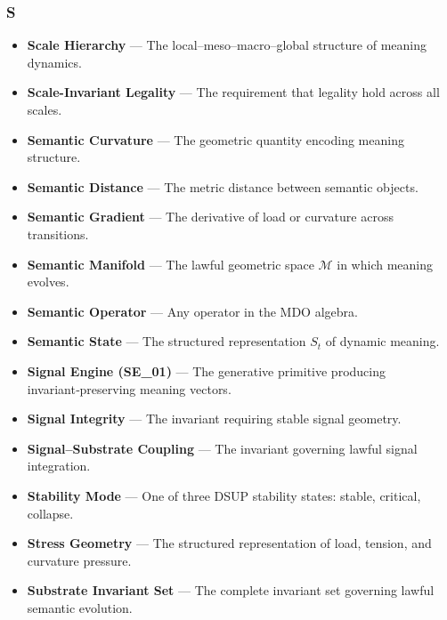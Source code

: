 \subsubsection*{S}
\begin{itemize}
    \item \textbf{Scale Hierarchy} — The local–meso–macro–global structure of
    meaning dynamics.

    \item \textbf{Scale-Invariant Legality} — The requirement that legality hold
    across all scales.

    \item \textbf{Semantic Curvature} — The geometric quantity encoding meaning
    structure.

    \item \textbf{Semantic Distance} — The metric distance between semantic
    objects.

    \item \textbf{Semantic Gradient} — The derivative of load or curvature across
    transitions.

    \item \textbf{Semantic Manifold} — The lawful geometric space $\mathcal{M}$
    in which meaning evolves.

    \item \textbf{Semantic Operator} — Any operator in the MDO algebra.

    \item \textbf{Semantic State} — The structured representation $S_t$ of
    dynamic meaning.

    \item \textbf{Signal Engine (SE\_01)} — The generative primitive producing
    invariant‑preserving meaning vectors.

    \item \textbf{Signal Integrity} — The invariant requiring stable signal
    geometry.

    \item \textbf{Signal–Substrate Coupling} — The invariant governing lawful
    signal integration.

    \item \textbf{Stability Mode} — One of three DSUP stability states: stable,
    critical, collapse.

    \item \textbf{Stress Geometry} — The structured representation of load,
    tension, and curvature pressure.

    \item \textbf{Substrate Invariant Set} — The complete invariant set governing
    lawful semantic evolution.
\end{itemize}


